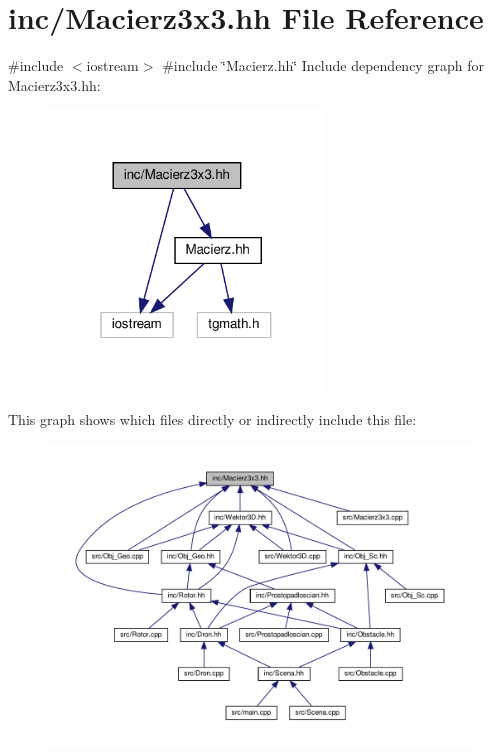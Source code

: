 \hypertarget{_macierz3x3_8hh}{}\section{inc/\+Macierz3x3.hh File Reference}
\label{_macierz3x3_8hh}
{\ttfamily \#include $<$iostream$>$}\newline
{\ttfamily \#include \char`\"{}Macierz.\+hh\char`\"{}}\newline
Include dependency graph for Macierz3x3.\+hh\+:\nopagebreak
\begin{figure}[H]
\begin{center}
\leavevmode
\includegraphics[width=208pt]{_macierz3x3_8hh__incl}
\end{center}
\end{figure}
This graph shows which files directly or indirectly include this file\+:
\nopagebreak
\begin{figure}[H]
\begin{center}
\leavevmode
\includegraphics[width=350pt]{_macierz3x3_8hh__dep__incl}
\end{center}
\end{figure}
